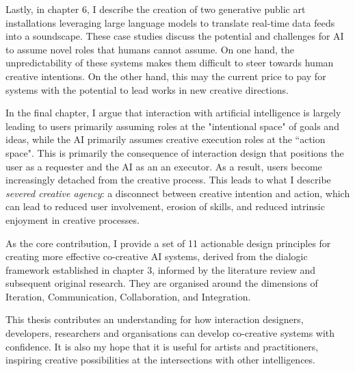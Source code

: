 Lastly, in chapter 6, I describe the creation of two generative public art installations leveraging large language models to translate real-time data feeds into a soundscape. These case studies discuss the potential and challenges for AI to assume novel roles that humans cannot assume. On one hand, the unpredictability of these systems makes them difficult to steer towards human creative intentions. On the other hand, this may the current price to pay for systems with the potential to lead works in new creative directions.  

In the final chapter, I argue that interaction with artificial intelligence is largely leading to users primarily assuming roles at the "intentional space" of goals and ideas, while the AI primarily assumes creative execution roles at the “action space". This is primarily the consequence of interaction design that positions the user as a requester and the AI as an an executor. As a result, users become increasingly detached from the creative process. This leads to what I describe \textit{severed creative agency}: a disconnect between creative intention and action, which can lead to reduced user involvement, erosion of skills, and reduced intrinsic enjoyment in creative processes.

As the core contribution, I provide a set of 11 actionable design principles for creating more effective co-creative AI systems, derived from the dialogic framework established in chapter 3, informed by the literature review and subsequent original research. They are organised around the dimensions of Iteration, Communication, Collaboration, and Integration. 

This thesis contributes an understanding for how interaction designers, developers, researchers and organisations can develop co-creative systems with confidence. It is also my hope that it is useful for artists and practitioners, inspiring creative possibilities at the intersections with other intelligences.